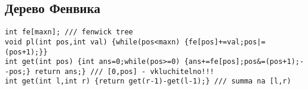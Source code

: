 \subsection{Дерево Фенвика}
\begin{lstlisting}
int fe[maxn]; /// fenwick tree
void pl(int pos,int val) {while(pos<maxn) {fe[pos]+=val;pos|=(pos+1);}}
int get(int pos) {int ans=0;while(pos>=0) {ans+=fe[pos];pos&=(pos+1);--pos;} return ans;} /// [0,pos] - vkluchitelno!!!
int get(int l,int r) {return get(r-1)-get(l-1);} /// summa na [l,r)
\end{lstlisting}